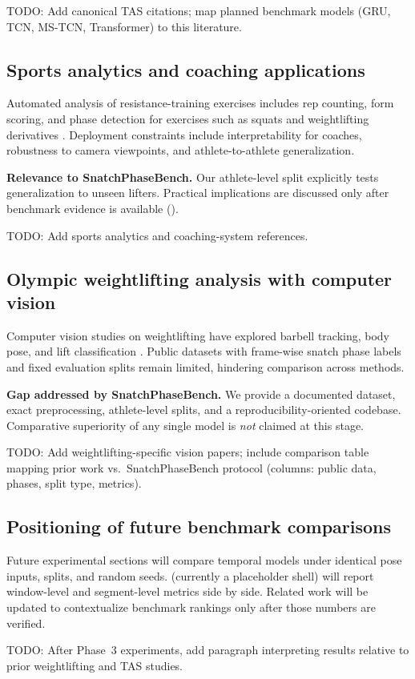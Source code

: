 \textsc{TODO:} Add canonical \acs{TAS} citations; map planned benchmark models (GRU, TCN, MS-TCN, Transformer) to this literature.

\subsection{Sports analytics and coaching applications}
\label{sec:related:sports}

Automated analysis of resistance-training exercises includes rep counting, form scoring, and phase detection for exercises such as squats and weightlifting derivatives .
Deployment constraints include interpretability for coaches, robustness to camera viewpoints, and athlete-to-athlete generalization.

\textbf{Relevance to SnatchPhaseBench.}
Our athlete-level split explicitly tests generalization to unseen lifters.
Practical implications are discussed only after benchmark evidence is available ().

\textsc{TODO:} Add sports analytics and coaching-system references.

\subsection{Olympic weightlifting analysis with computer vision}
\label{sec:related:wl}

Computer vision studies on weightlifting have explored barbell tracking, body pose, and lift classification .
Public datasets with frame-wise snatch phase labels and fixed evaluation splits remain limited, hindering comparison across methods.

\textbf{Gap addressed by SnatchPhaseBench.}
We provide a documented dataset, exact preprocessing, athlete-level splits, and a reproducibility-oriented codebase.
Comparative superiority of any single model is \emph{not} claimed at this stage.

\textsc{TODO:} Add weightlifting-specific vision papers; include comparison table mapping prior work vs.\ SnatchPhaseBench protocol (columns: public data, phases, split type, metrics).

\subsection{Positioning of future benchmark comparisons}
\label{sec:related:benchmark_plan}

Future experimental sections will compare temporal models under identical pose inputs, splits, and random seeds.
 (currently a placeholder shell) will report window-level and segment-level metrics side by side.
Related work will be updated to contextualize benchmark rankings only after those numbers are verified.

\textsc{TODO:} After Phase~3 experiments, add paragraph interpreting results relative to prior weightlifting and \acs{TAS} studies.
